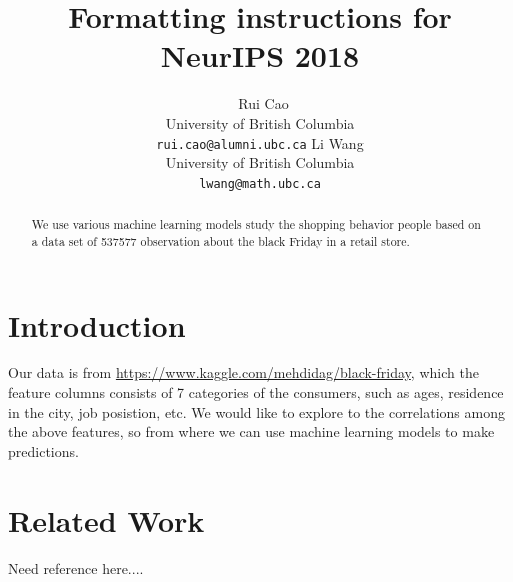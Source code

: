 \documentclass{article}
\title{Formatting instructions for NeurIPS 2018}
\author{ %
   \AND
   \ Rui Cao \\
    University of British Columbia \\
    \texttt{rui.cao@alumni.ubc.ca}
   \AND
    Li Wang \\
    University of British Columbia\\
    \texttt{lwang@math.ubc.ca} \\
}
\begin{document}

\maketitle

\begin{abstract}
  We use various machine learning models study the shopping behavior people based on a data set of 537577 observation about the black Friday in a retail store. 
\end{abstract}

\section{Introduction}
	Our data is from \url{https://www.kaggle.com/mehdidag/black-friday}, which 
	the feature columns consists of 7 categories of the consumers, such as ages, residence in the city, job posistion, etc. 
	We would like to explore to the correlations among the above features, so from where we can use machine learning models to make predictions.

\section{Related Work}
Need reference here....
\end{document}

